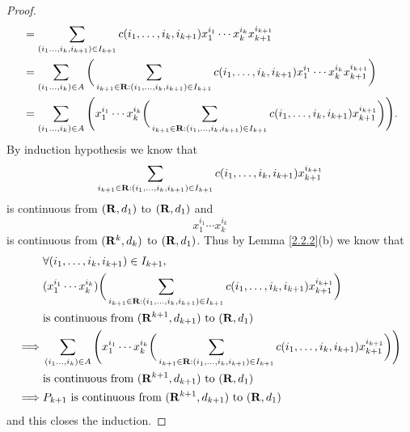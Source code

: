 \begin{proof}
\begin{align*}
         & = \sum_{(i_1 \dots, i_k, i_{k + 1}) \in I_{k + 1}} c(i_1, \dots, i_k, i_{k + 1}) x_1^{i_1} \cdots x_k^{i_k} x_{k + 1}^{i_{k + 1}}                                                                            \\
         & = \sum_{(i_1 \dots, i_k) \in A} \bigg(\sum_{i_{k + 1} \in \mathbf{R} : (i_1, \dots, i_k, i_{k + 1}) \in I_{k + 1}} c(i_1, \dots, i_k, i_{k + 1}) x_1^{i_1} \cdots x_k^{i_k} x_{k + 1}^{i_{k + 1}}\bigg)              \\
         & = \sum_{(i_1 \dots, i_k) \in A} \Bigg(x_1^{i_1} \cdots x_k^{i_k} \bigg(\sum_{i_{k + 1} \in \mathbf{R} : (i_1, \dots, i_k, i_{k + 1}) \in I_{k + 1}} c(i_1, \dots, i_k, i_{k + 1}) x_{k + 1}^{i_{k + 1}}\bigg)\Bigg).
    \end{align*}
    By induction hypothesis we know that
    \[
        \sum_{i_{k + 1} \in \mathbf{R} : (i_1, \dots, i_k, i_{k + 1}) \in I_{k + 1}} c(i_1, \dots, i_k, i_{k + 1}) x_{k + 1}^{i_{k + 1}}
    \]
    is continuous from \((\mathbf{R}, d_1)\) to \((\mathbf{R}, d_1)\) and
    \[
        x_1^{i_1} \cdots x_k^{i_k}
    \]
    is continuous from \((\mathbf{R}^k, d_k)\) to \((\mathbf{R}, d_1)\).
    Thus by Lemma \ref{2.2.2}(b) we know that
    \begin{align*}
                 & \forall (i_1, \dots, i_k, i_{k + 1}) \in I_{k + 1},                                                                                                                                                       \\
                 & (x_1^{i_1} \cdots x_k^{i_k}) \bigg(\sum_{i_{k + 1} \in \mathbf{R} : (i_1, \dots, i_k, i_{k + 1}) \in I_{k + 1}} c(i_1, \dots, i_k, i_{k + 1}) x_{k + 1}^{i_{k + 1}}\bigg)                                         \\
                 & \text{is continuous from } (\mathbf{R}^{k + 1}, d_{k + 1}) \text{ to } (\mathbf{R}, d_1)                                                                                                                                  \\
        \implies & \sum_{(i_1 \dots, i_k) \in A} \Bigg(x_1^{i_1} \cdots x_k^{i_k} \bigg(\sum_{i_{k + 1} \in \mathbf{R} : (i_1, \dots, i_k, i_{k + 1}) \in I_{k + 1}} c(i_1, \dots, i_k, i_{k + 1}) x_{k + 1}^{i_{k + 1}}\bigg)\Bigg) \\
                 & \text{is continuous from } (\mathbf{R}^{k + 1}, d_{k + 1}) \text{ to } (\mathbf{R}, d_1)                                                                                                                                  \\
        \implies & P_{k + 1} \text{ is continuous from } (\mathbf{R}^{k + 1}, d_{k + 1}) \text{ to } (\mathbf{R}, d_1)
    \end{align*}
    and this closes the induction.
\end{proof}

